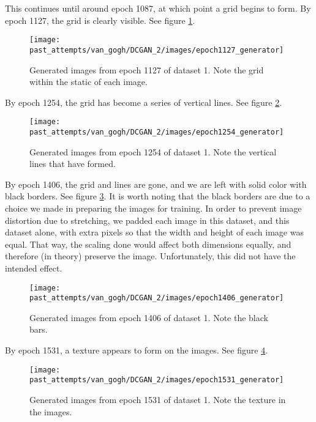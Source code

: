 \documentclass[11pt,letterpaper]{article}
\begin{document}
				This continues until around epoch 1087, at which point a grid begins to form.
				By epoch 1127, the grid is clearly visible.
				See figure \ref{fig:vgm:epoch1127generator}.
				\begin{figure}
					\centering
					\texttt{[image: past\_attempts/van\_gogh/DCGAN\_2/images/epoch1127\_generator]}
					\caption[Van Gogh Museum dataset, epoch 1127]{Generated images from epoch 1127 of dataset 1. Note the grid within the static of each image.}
					\label{fig:vgm:epoch1127generator}
				\end{figure}

				By epoch 1254, the grid has become a series of vertical lines.
				See figure \ref{fig:vgm:epoch1254generator}.
				\begin{figure}
					\centering
					\texttt{[image: past\_attempts/van\_gogh/DCGAN\_2/images/epoch1254\_generator]}
					\caption[Van Gogh Museum dataset, epoch 1254]{Generated images from epoch 1254 of dataset 1. Note the vertical lines that have formed.}
					\label{fig:vgm:epoch1254generator}
				\end{figure}

				By epoch 1406, the grid and lines are gone, and we are left with solid color with black borders.
				See figure \ref{fig:vgm:epoch1406generator}.
				It is worth noting that the black borders are due to a choice we made in preparing the images for training.
				In order to prevent image distortion due to stretching, we padded each image in this dataset, and this dataset alone, with extra pixels so that the width and height of each image was equal.
				That way, the scaling done would affect both dimensions equally, and therefore (in theory) preserve the image.
				Unfortunately, this did not have the intended effect.
				\begin{figure}
					\centering
					\texttt{[image: past\_attempts/van\_gogh/DCGAN\_2/images/epoch1406\_generator]}
					\caption[Van Gogh Museum dataset, epoch 1406]{Generated images from epoch 1406 of dataset 1. Note the black bars.}
					\label{fig:vgm:epoch1406generator}
				\end{figure}

				By epoch 1531, a texture appears to form on the images.
				See figure \ref{fig:vgm:epoch1531generator}.
				\begin{figure}
					\centering
					\texttt{[image: past\_attempts/van\_gogh/DCGAN\_2/images/epoch1531\_generator]}
					\caption[Van Gogh Museum dataset, epoch 1531]{Generated images from epoch 1531 of dataset 1. Note the texture in the images.}
					\label{fig:vgm:epoch1531generator}
				\end{figure}
\end{document}
